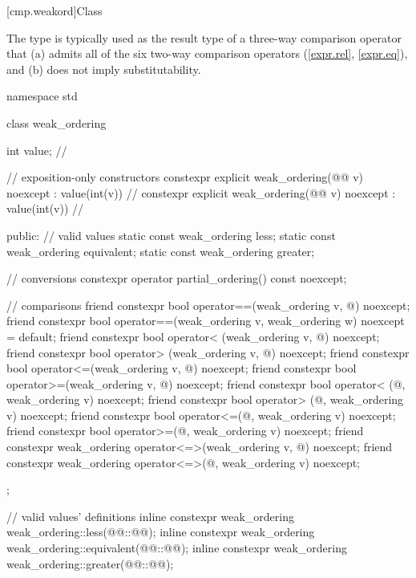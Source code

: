 [cmp.weakord]{Class }

\pnum
The  type is typically used
as the result type of a three-way comparison operator
that (a) admits all of the six two-way comparison operators (\ref{expr.rel}, \ref{expr.eq}),
and (b) does not imply substitutability.

%
%
%
%
\begin{codeblock}
namespace std {
  class weak_ordering {
    int value;  // \expos

    // exposition-only constructors
    constexpr explicit weak_ordering(@@ v) noexcept : value(int(v)) {}  // \expos
    constexpr explicit weak_ordering(@@ v) noexcept : value(int(v)) {} // \expos

  public:
    // valid values
    static const weak_ordering less;
    static const weak_ordering equivalent;
    static const weak_ordering greater;

    // conversions
    constexpr operator partial_ordering() const noexcept;

    // comparisons
    friend constexpr bool operator==(weak_ordering v, @\unspec@) noexcept;
    friend constexpr bool operator==(weak_ordering v, weak_ordering w) noexcept = default;
    friend constexpr bool operator< (weak_ordering v, @\unspec@) noexcept;
    friend constexpr bool operator> (weak_ordering v, @\unspec@) noexcept;
    friend constexpr bool operator<=(weak_ordering v, @\unspec@) noexcept;
    friend constexpr bool operator>=(weak_ordering v, @\unspec@) noexcept;
    friend constexpr bool operator< (@\unspec@, weak_ordering v) noexcept;
    friend constexpr bool operator> (@\unspec@, weak_ordering v) noexcept;
    friend constexpr bool operator<=(@\unspec@, weak_ordering v) noexcept;
    friend constexpr bool operator>=(@\unspec@, weak_ordering v) noexcept;
    friend constexpr weak_ordering operator<=>(weak_ordering v, @\unspec@) noexcept;
    friend constexpr weak_ordering operator<=>(@\unspec@, weak_ordering v) noexcept;
  };

  // valid values' definitions
  inline constexpr weak_ordering weak_ordering::less(@@::@@);
  inline constexpr weak_ordering weak_ordering::equivalent(@@::@@);
  inline constexpr weak_ordering weak_ordering::greater(@@::@@);
}
\end{codeblock}

